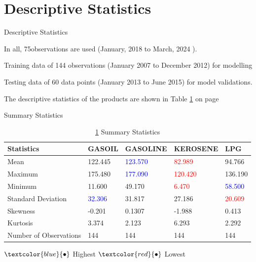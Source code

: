\documentclass{beamer}
\newcommand{\colorPrimary}{blue}
\newcommand{\colorWarning}{red}
\newcommand{\textPrimary}[1]{\textcolor{\colorPrimary}{#1}}
\newcommand{\tPrim}[1]{\textcolor{\colorPrimary}{#1}}
\newcommand{\textWarning}[1]{\textcolor{\colorWarning}{#1}}
\newcommand{\tWarn}[1]{\textcolor{\colorWarning}{#1}}
\newcommand{\startDate}{January, 2018 }
\newcommand{\finishDate}{March, 2024 }
\newcommand{\numOfObservations}{75}
\begin{document}
	\section{Descriptive Statistics}
	\begin{frame}{Descriptive Statistics}
		\begin{block}{}
			\vspace{4pt}
			In all, \numOfObservations observations are used (\startDate to \finishDate). \vspace{4pt}
		\end{block} \vspace{5pt}
		
		\begin{block}{}
		Training data of 144 observations (January 2007 to December 2012) for modelling \\ \vspace{5pt}
		
		Testing data of 60 data points (January 2013 to June 2015) for model validations.
		\end{block} \vspace{5pt}
	
		\begin{block}{}
			The descriptive statistics of the products are shown in Table \ref{table:description} on page \pageref{table:description}
		\end{block}
	\end{frame}
	
	\begin{frame}{Summary Statistics}
		\begin{table}[]
			\caption{ \ref{table:description} Summary Statistics}
			\begin{tabular}{lllll}
				\toprule
				Statistics  & GASOIL  & GASOLINE & KEROSENE & LPG \\ 
				\midrule
				
				Mean    & 122.445 & \tPrim{123.570} & \tWarn{82.989} & 94.766  \\ [5pt]
				Maximum & 175.480 & \tPrim{177.090} & \tWarn{120.420} & 136.190 \\ [5pt]
				Minimum & 11.600  & 49.170 & \tWarn{6.470} & \tPrim{58.500} \\ [5pt]
		Standard Deviation & \tPrim{32.306} & 31.817 & 27.186 & \tWarn{20.609 }\\ [5pt]
				Skewness & -0.201  & 0.1307   & -1.988   & 0.413   \\ [5pt]
				Kurtosis & 3.374   & 2.123    & 6.293    & 2.292   \\ [5pt]
				Number of Observations & 144     & 144      & 144      & 144 \\
				\bottomrule
			\end{tabular}
			\label{table:description}
		\end{table}
		\begin{center}
			{\LARGE $\textPrimary{\bullet}$ } Highest \hspace{20pt}
			{\LARGE $ \textWarning{\bullet} $} Lowest
		\end{center}
		
	\end{frame}
\end{document}
